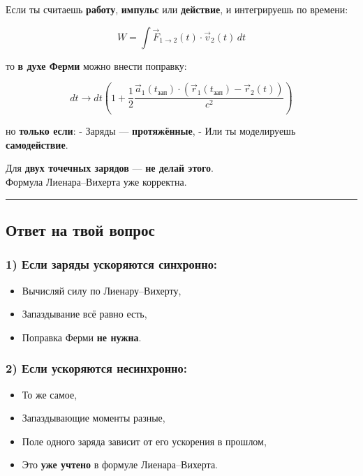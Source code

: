 \documentclass[11pt]{article}
\providecommand{\tightlist}{%
      \setlength{\itemsep}{0pt}\setlength{\parskip}{0pt}}
\begin{document}
Если ты считаешь \textbf{работу}, \textbf{импульс} или
\textbf{действие}, и интегрируешь по времени:

\[
W = \int \vec{F}_{1 \to 2}(t) \cdot \vec{v}_2(t) \, dt
\]

то \textbf{в духе Ферми} можно внести поправку:

\[
dt \to dt \left( 1 + \frac{1}{2} \frac{\vec{a}_1(t_{\text{зап}}) \cdot (\vec{r}_1(t_{\text{зап}}) - \vec{r}_2(t))}{c^2} \right)
\]

но \textbf{только если}: - Заряды --- \textbf{протяжённые}, - Или ты
моделируешь \textbf{самодействие}.

 Для \textbf{двух точечных зарядов} --- \textbf{не делай этого}.\\
Формула Лиенара--Вихерта уже корректна.

\begin{center}\rule{0.5\linewidth}{\linethickness}\end{center}

\subsection{ Ответ на твой вопрос}
\subsubsection{\texorpdfstring{1) Если заряды ускоряются
\textbf{синхронно}:}{1) Если заряды ускоряются синхронно:}}
\begin{itemize}
\tightlist
\item
  Вычисляй силу по Лиенару--Вихерту,
\item
  Запаздывание всё равно есть,
\item
  Поправка Ферми \textbf{не нужна}.
\end{itemize}

\subsubsection{\texorpdfstring{2) Если ускоряются \textbf{несинхронно}:}{2) Если ускоряются несинхронно:}}

\begin{itemize}
\tightlist
\item
  То же самое,
\item
  Запаздывающие моменты разные,
\item
  Поле одного заряда зависит от его ускорения в прошлом,
\item
  Это \textbf{уже учтено} в формуле Лиенара--Вихерта.
\end{itemize}
\end{document}
